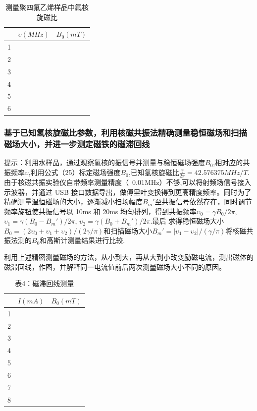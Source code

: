 \documentclass{ctexart}
\begin{document}
\begin{table}[H]
	\centering
	\caption{测量聚四氟乙烯样品中氟核旋磁比}\label{表3}
		\begin{tabular}{| c | p{4cm} | p{4cm} |}
		\hline
		& $\upsilon(MHz)$ & $B_0(mT)$ \\
		\hline
		1 &  &   \\
		\hline
		2 &  &   \\
		\hline
		3 &  &   \\
		\hline
		4 &  &   \\
		\hline
		5 &  &   \\
		\hline
		6 &  &   \\
		\hline
	\end{tabular}
\end{table}
	
	\subsubsection{基于已知氢核旋磁比参数，利用核磁共振法精确测量稳恒磁场和扫描磁场大小，并进一步测定磁铁的磁滞回线}
	提示：利用水样品，通过观察氢核的振信号并测量与稳恒磁场强度$B_0$,相对应的共振频率$\upsilon$,利用公式（25）标定磁场强度$B_0$,已知氢核旋磁比$\frac{\gamma}{2\pi}=42.576375 MHz/T$.由于核磁共振实验仪自带频率测量精度（~0.01MHz）不够,可以将射频场信号接入示波器，并通过 USB 接口数据导出，做傅里叶变换得到更高精度频率。同时为了精确测量温恒磁场的大小，逐渐减小扫场幅度$B_m'$至共振信号依然存在，同时调节频率旋钮使共振信号以 10ms 和 20ms 均匀排列，得到共振频率$\upsilon_0=\gamma B_0/2\pi$, $\upsilon_1=\gamma (B_0-B_m')/2\pi$, $\upsilon_2=\gamma (B_0+B_m')/2\pi$.最后
	求得稳恒磁场大小$B_0=(2\upsilon_0+\upsilon_1+\upsilon_2)/(2\gamma /\pi)$和扫描磁场大小$B_m'=\left|\upsilon_1-\upsilon_2\right|/(\gamma/\pi)$将核磁共振法测的$B_0$和高斯计测量结果进行比较.
	
	利用上述精密测量磁场的方法，从小到大，再从大到小改变励磁电流，测出磁体的磁滞回线，作图，并解释同一电流值前后两次测量磁场大小不同的原因。
	\begin{table}[H]
		\centering
		\caption{表4：磁滞回线测量}\label{表4}
		\begin{tabular}{| c | p{4cm} | p{4cm} |}
			\hline
			& $I(mA)$ & $B_0(mT)$ \\
			\hline
			1 &  &   \\
			\hline
			2 &  &   \\
			\hline
			3 &  &   \\
			\hline
			4 &  &   \\
			\hline
			5 &  &   \\
			\hline
			6 &  &   \\
			\hline
			7 &  &   \\
			\hline
			8 &  &   \\
			\hline
		\end{tabular}
	\end{table}
	
\end{document}
